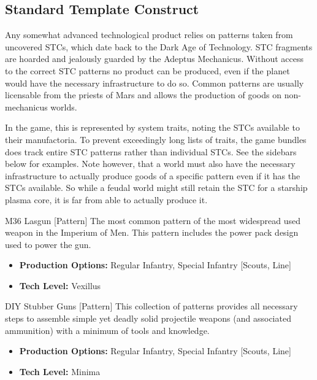 \subsection{Standard Template Construct}
Any somewhat advanced technological product relies on patterns taken from uncovered STCs, which date back to the Dark Age of Technology. STC fragments are hoarded and jealously guarded by the Adeptus Mechanicus. Without access to the correct STC patterns no product can be produced, even if the planet would have the necessary infrastructure to do so. 
Common patterns are usually licensable from the priests of Mars and allows the production of goods on non-mechanicus worlds.

In the game, this is represented by system traits, noting the STCs available to their manufactoria. To prevent exceedingly long lists of traits, the game bundles does track entire STC patterns rather than individual STCs. See the sidebars below for examples. Note however, that a world must also have the necessary infrastructure to actually produce goods of a specific pattern even if it has the STCs available. So while a feudal world might still retain the STC for a starship plasma core, it is far from able to actually produce it.

\begin{DndSidebar}{M36 Lasgun [Pattern]}
 The most common pattern of the most widespread used weapon in the Imperium of Men. This pattern includes the power pack design used to power the gun.
 \begin{itemize}
 	\item \textbf{Production Options:} Regular Infantry, Special Infantry [Scouts, Line]
 	\item \textbf{Tech Level:} Vexillus
 \end{itemize}
\end{DndSidebar}

\begin{DndSidebar}{DIY Stubber Guns [Pattern]}
This collection of patterns provides all necessary steps to assemble simple yet deadly solid projectile weapons (and associated ammunition) with a minimum of tools and knowledge.
 \begin{itemize}
 	\item \textbf{Production Options:} Regular Infantry, Special Infantry [Scouts, Line]
 	\item \textbf{Tech Level:} Minima
 \end{itemize}
\end{DndSidebar}



